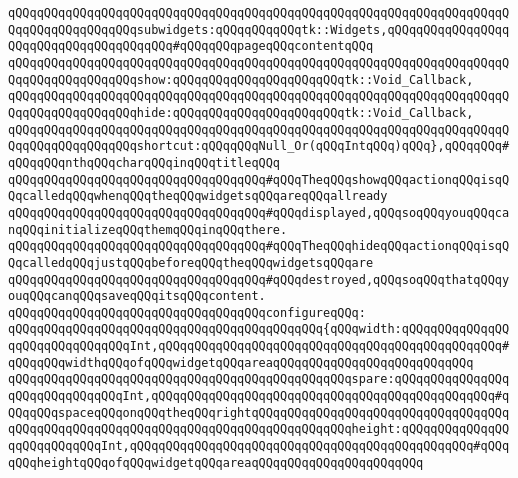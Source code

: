 \verb|qQQqqQQqqQQqqQQqqQQqqQQqqQQqqQQqqQQqqQQqqQQqqQQqqQQqqQQqqQQqqQQqqQQqqQQqqQQqqQQqqQQqqQQqsubwidgets:qQQqqQQqqQQqtk::Widgets,qQQqqQQqqQQqqQQqqQQqqQQqqQQqqQQqqQQqqQQq#qQQqqQQqpageqQQqcontentqQQq|\newline
\verb|qQQqqQQqqQQqqQQqqQQqqQQqqQQqqQQqqQQqqQQqqQQqqQQqqQQqqQQqqQQqqQQqqQQqqQQqqQQqqQQqqQQqqQQqshow:qQQqqQQqqQQqqQQqqQQqqQQqtk::Void_Callback,|\newline
\verb|qQQqqQQqqQQqqQQqqQQqqQQqqQQqqQQqqQQqqQQqqQQqqQQqqQQqqQQqqQQqqQQqqQQqqQQqqQQqqQQqqQQqqQQqhide:qQQqqQQqqQQqqQQqqQQqqQQqtk::Void_Callback,|\newline
\verb|qQQqqQQqqQQqqQQqqQQqqQQqqQQqqQQqqQQqqQQqqQQqqQQqqQQqqQQqqQQqqQQqqQQqqQQqqQQqqQQqqQQqqQQqshortcut:qQQqqQQqNull_Or(qQQqIntqQQq)qQQq},qQQqqQQq#qQQqqQQqnthqQQqcharqQQqinqQQqtitleqQQq|\newline
\newline
\newline
\verb|qQQqqQQqqQQqqQQqqQQqqQQqqQQqqQQqqQQq#qQQqTheqQQqshowqQQqactionqQQqisqQQqcalledqQQqwhenqQQqtheqQQqwidgetsqQQqareqQQqallready|\newline
\verb|qQQqqQQqqQQqqQQqqQQqqQQqqQQqqQQqqQQq#qQQqdisplayed,qQQqsoqQQqyouqQQqcanqQQqinitializeqQQqthemqQQqinqQQqthere.|\newline
\verb|qQQqqQQqqQQqqQQqqQQqqQQqqQQqqQQqqQQq#qQQqTheqQQqhideqQQqactionqQQqisqQQqcalledqQQqjustqQQqbeforeqQQqtheqQQqwidgetsqQQqare|\newline
\verb|qQQqqQQqqQQqqQQqqQQqqQQqqQQqqQQqqQQq#qQQqdestroyed,qQQqsoqQQqthatqQQqyouqQQqcanqQQqsaveqQQqitsqQQqcontent.|\newline
\newline
\newline
\verb|qQQqqQQqqQQqqQQqqQQqqQQqqQQqqQQqqQQqconfigureqQQq:|\newline
\verb|qQQqqQQqqQQqqQQqqQQqqQQqqQQqqQQqqQQqqQQqqQQq{qQQqwidth:qQQqqQQqqQQqqQQqqQQqqQQqqQQqqQQqInt,qQQqqQQqqQQqqQQqqQQqqQQqqQQqqQQqqQQqqQQqqQQqqQQq#qQQqqQQqwidthqQQqofqQQqwidgetqQQqareaqQQqqQQqqQQqqQQqqQQqqQQqqQQq|\newline
\verb|qQQqqQQqqQQqqQQqqQQqqQQqqQQqqQQqqQQqqQQqqQQqqQQqspare:qQQqqQQqqQQqqQQqqQQqqQQqqQQqqQQqInt,qQQqqQQqqQQqqQQqqQQqqQQqqQQqqQQqqQQqqQQqqQQqqQQq#qQQqqQQqspaceqQQqonqQQqtheqQQqrightqQQqqQQqqQQqqQQqqQQqqQQqqQQqqQQqqQQq|\newline
\verb|qQQqqQQqqQQqqQQqqQQqqQQqqQQqqQQqqQQqqQQqqQQqqQQqheight:qQQqqQQqqQQqqQQqqQQqqQQqqQQqInt,qQQqqQQqqQQqqQQqqQQqqQQqqQQqqQQqqQQqqQQqqQQqqQQq#qQQqqQQqheightqQQqofqQQqwidgetqQQqareaqQQqqQQqqQQqqQQqqQQqqQQq|\newline
